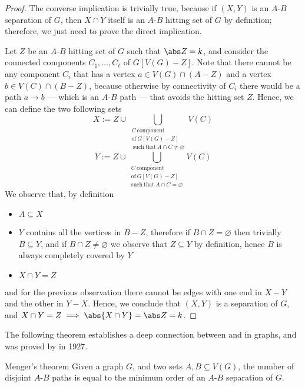 \documentclass[a4paper, 12pt]{report}
\begin{document}
    \begin{proof}
        The converse implication is trivially true, because if $(X, Y)$ is an $A$-$B$ separation of $G$, then $X \cap Y$ itself is an $A$-$B$ hitting set of $G$ by definition; therefore, we just need to prove the direct implication.
        
        Let $Z$ be an $A$-$B$ hitting set of $G$ such that $\abs Z = k$, and consider the connected components $C_1, \ldots, C_\ell$ of $G[V(G) - Z]$. Note that there cannot be any component $C_i$ that has a vertex $a \in V(G) \cap (A - Z)$ and a vertex $b \in V(C) \cap (B - Z)$, because otherwise by connectivity of $C_i$ there would be a path $a \to b$ --- which is an $A$-$B$ path --- that avoids the hitting set $Z$. Hence, we can define the two following sets $$X := Z \cup \bigcup_{\substack{C \ \mathrm{component} \\ \mathrm{of} \ G[V(G) - Z] \\ \ \mathrm{such \ that} \ A \cap C \neq \varnothing}}{V(C)}$$ $$Y := Z \cup \bigcup_{\substack{C \ \mathrm{component} \\ \mathrm{of} \ G[V(G) - Z] \\ \mathrm{such \ that} \ A \cap C = \varnothing}}{V(C)}$$ We observe that, by definition

        \begin{itemize}
            \item $A \subseteq X$
            \item $Y$ contains all the vertices in $B - Z$, therefore if $B \cap Z = \varnothing$ then trivially $B \subseteq Y$, and if $B \cap Z \neq \varnothing$ we observe that $Z \subseteq Y$ by definition, hence $B$ is always completely covered by $Y$
            \item $X \cap Y = Z$
        \end{itemize}

        and for the previous observation there cannot be edges with one end in $X - Y$ and the other in $Y - X$. Hence, we conclude that $(X, Y)$ is a separation of $G$, and $X \cap Y = Z \implies \abs{X \cap Y} = \abs Z = k$.
    \end{proof}

    The following theorem establishes a deep connection between  and  in graphs, and was proved by \textcite{menger} in 1927.

    \begin{framedthm}[label={menger}]{Menger's theorem}
        Given a graph $G$, and two sets $A, B \subseteq V(G)$, the number of disjoint $A$-$B$ paths is equal to the minimum order of an $A$-$B$ separation of $G$.
    \end{framedthm}
\end{document}
